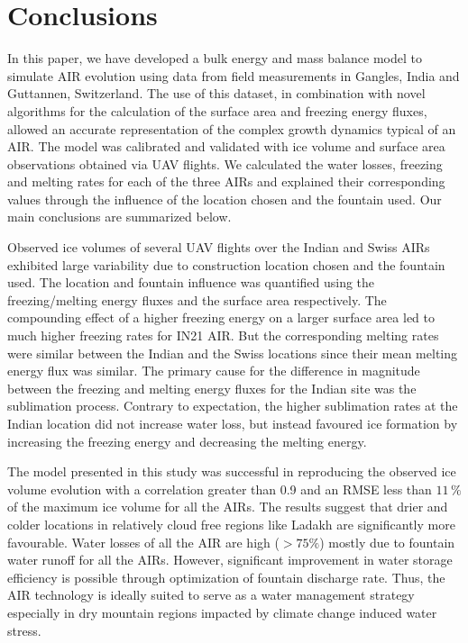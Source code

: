 \documentclass[utf8]{frontiersSCNS} %
\begin{document}
\section{Conclusions}

In this paper, we have developed a bulk energy and mass balance model to simulate AIR evolution using data from
field measurements in Gangles, India and Guttannen, Switzerland. The use of this dataset, in combination with
novel algorithms for the calculation of the surface area and freezing energy fluxes, allowed an accurate
representation of the complex growth dynamics typical of an AIR. The model was calibrated and validated with ice
volume and surface area observations obtained via UAV flights. We calculated the water losses, freezing and
melting rates for each of the three AIRs and explained their corresponding values through the influence of the
location chosen and the fountain used. Our main conclusions are summarized below.

Observed ice volumes of several UAV flights over the Indian and Swiss AIRs exhibited large variability due to
construction location chosen and the fountain used. The location and fountain influence was quantified using the
freezing/melting energy fluxes and the surface area respectively. The compounding effect of a higher freezing
energy on a larger surface area led to much higher freezing rates for IN21 AIR. But the corresponding melting
rates were similar between the Indian and the Swiss locations since their mean melting energy flux was similar.
The primary cause for the difference in magnitude between the freezing and melting energy fluxes for the Indian
site was the sublimation process.  Contrary to expectation, the higher sublimation rates at the Indian location
did not increase water loss, but instead favoured ice formation by increasing the freezing energy and decreasing
the melting energy.

The model presented in this study was successful in reproducing the observed ice volume evolution with a
correlation greater than 0.9 and an RMSE less than $11 \, \%$ of the maximum ice volume for all the AIRs. The
results suggest that drier and colder locations in relatively cloud free regions like Ladakh are significantly
more favourable. Water losses of all the AIR are high ($>75\%$) mostly due to fountain water runoff for all the
AIRs. However, significant improvement in water storage efficiency is possible through optimization of fountain
discharge rate. Thus, the AIR technology is ideally suited to serve as a water management strategy especially in
dry mountain regions impacted by climate change induced water stress.
\end{document}
